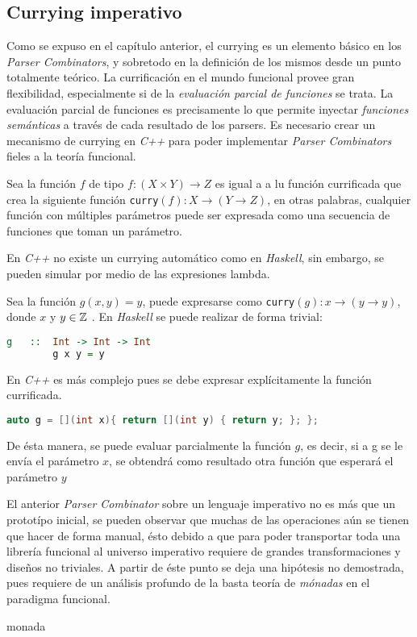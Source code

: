 	\subsection{Currying imperativo}
	Como se expuso en el capítulo anterior, el currying es un elemento básico en los \emph{Parser Combinators}, y sobretodo en la definición de los mismos desde un punto totalmente teórico. La currificación en el mundo funcional provee gran flexibilidad, especialmente si de la \emph{evaluación parcial de funciones} se trata. La evaluación parcial de funciones es precisamente lo que permite inyectar \emph{funciones semánticas} a través de cada resultado de los parsers.
	Es necesario crear un mecanismo de currying en \emph{C++} para poder implementar \emph{Parser Combinators} fieles a la teoría funcional.
	
	\begin{exmp}
		Sea la función $f$ de tipo
		$f:(X \times Y) \to Z$ es igual a a lu función currificada que crea la siguiente función \texttt{curry}$(f): X \to (Y \to Z)$, en otras palabras, cualquier función con múltiples parámetros puede ser expresada como una secuencia de funciones que toman un parámetro.		
	\end{exmp}
	
	En \emph{C++} no existe un currying automático como en \emph{Haskell}, sin embargo, se pueden simular por medio de las expresiones lambda.
	
	\begin{exmp}
		Sea la función $g(x,y) = y$, puede expresarse como \texttt{curry}$(g): x \to (y \to y)$, donde $x$ y $y \in \mathbb{Z}$ . En \emph{Haskell} se puede realizar de forma trivial:
		\begin{lstlisting}[language=Haskell, caption=g currificada en Haskell]
		g	::	Int -> Int -> Int
		g x y = y
		\end{lstlisting}
		
		En \emph{C++} es más complejo pues se debe expresar explícitamente la función currificada.		
		
		\begin{lstlisting}[language=C++, caption=g currificada en C++]
		auto g = [](int x){ return [](int y) { return y; }; };
		\end{lstlisting}	
		
		De ésta manera, se puede evaluar parcialmente la función $g$, es decir, si a g se le envía el parámetro $x$, se obtendrá como resultado otra función que esperará el parámetro $y$
	\end{exmp}
	
	
	
	
El anterior \emph{Parser Combinator} sobre un lenguaje imperativo no es más que un prototípo inicial, se pueden observar que muchas de las operaciones aún se tienen que hacer de forma manual, ésto debido a que para poder transportar toda una librería funcional al universo imperativo requiere de grandes transformaciones y diseños no triviales. A partir de éste punto se deja una hipótesis no demostrada, pues requiere de un análisis profundo de la basta teoría de \emph{mónadas} en el paradigma funcional.

\begin{conj}
	monada
\end{conj}

